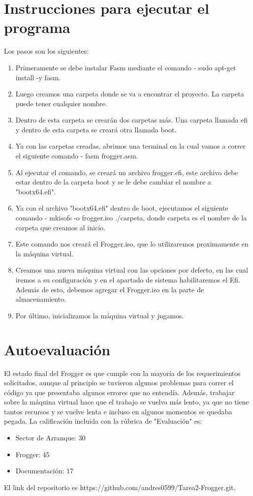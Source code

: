 \documentclass{article}
\begin{document}
\section{Instrucciones para ejecutar el programa}
Los pasos son los siguientes: 
\begin{enumerate}
    \item Primeramente se debe instalar Fasm mediante el comando - sudo apt-get install -y fasm.
    \item Luego creamos una carpeta donde se va a encontrar el proyecto. La carpeta puede tener cualquier nombre. 
    \item Dentro de esta carpeta se crearán dos carpetas más. Una carpeta llamada efi y dentro de esta carpeta se creará otra llamada boot. 
    \item Ya con las carpetas creadas, abrimos una terminal en la cual vamos a correr el siguiente comando - fasm frogger.asm. 
    \item Al ejecutar el comando, se creará un archivo frogger.efi, este archivo debe estar dentro de la carpeta boot y se le debe cambiar el nombre a "bootx64.efi". 
    \item Ya con el archivo "bootx64.efi" dentro de boot, ejecutamos el siguiente comando - mkisofs -o frogger.iso ./carpeta, donde carpeta es el nombre de la carpeta que creamos al inicio. 
    \item Este comando nos creará el Frogger.iso, que lo utilizaremos proximamente en la máquina virtual. 
    \item Creamos una nueva máquina virtual con las opciones por defecto, en las cual iremos a su configuración y en el apartado de sistema habilitaremos el Efi. Además de esto, debemos agregar el Frogger.iso en la parte de almacenamiento. 
    \item Por último, inicializamos la máquina virtual y jugamos. 
\end{enumerate}

\section{Autoevaluación}
El estado final del Frogger es que cumple con la mayoría de los requerimientos solicitados, aunque al principio se tuvieron algunos problemas para correr el código ya que presentaba
algunos errores que no entendía. Además, trabajar sobre la máquina virtual hace que el trabajo se vuelva más lento, ya que no tiene tantos recursos y se vuelve lenta e incluso en algunos
momentos se quedaba pegada. 
La calificación incluida con la rúbrica de "Evaluación" es:
\begin{itemize}
    \item Sector de Arranque: 30
    \item Frogger: 45
    \item Documentación: 17 
\end{itemize}
El link del repositorio es https://github.com/andres0599/Tarea2-Frogger.git.
\end{document}
